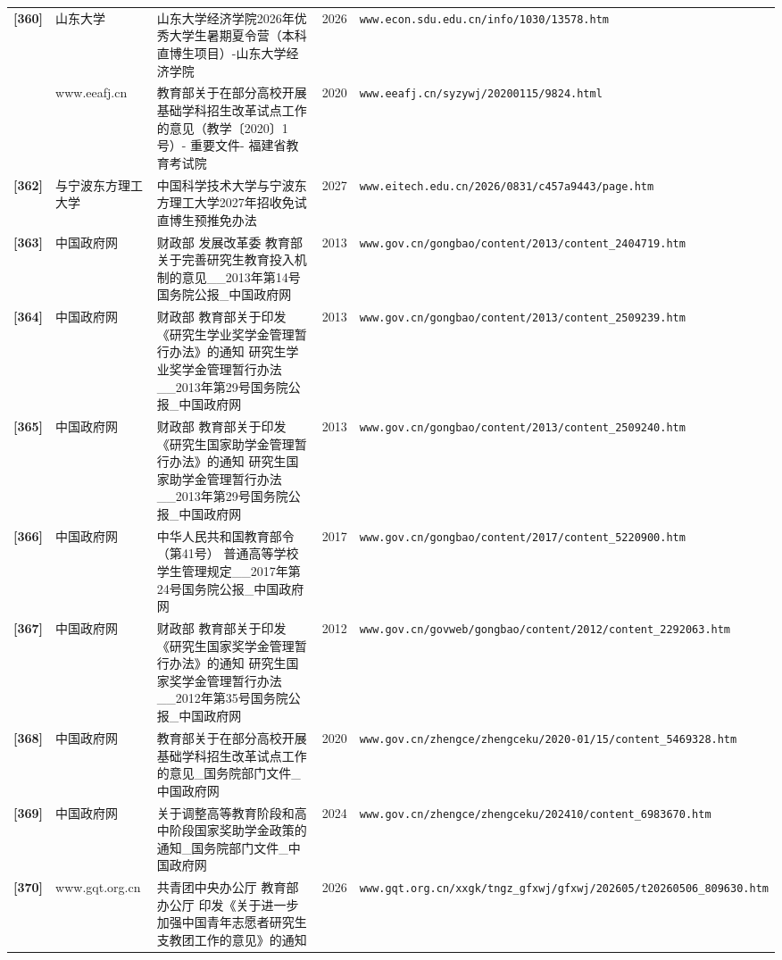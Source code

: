 {\begin{longtable}{@{}p{1.15cm}p{2.9cm}p{6.3cm}p{0.85cm}p{5.0cm}@{}}
\textbf{[360]} & 山东大学 & 山东大学经济学院2026年优秀大学生暑期夏令营（本科直博生项目）-山东大学经济学院 & 2026 & \texttt{www.econ.sdu.edu.cn/info/1030/13578.htm} \\
[361] & www.eeafj.cn & 教育部关于在部分高校开展基础学科招生改革试点工作的意见（教学〔2020〕1号）-
重要文件-
福建省教育考试院 & 2020 & \texttt{www.eeafj.cn/syzywj/20200115/9824.html} \\
\textbf{[362]} & 与宁波东方理工大学 & 中国科学技术大学与宁波东方理工大学2027年招收免试直博生预推免办法 & 2027 & \texttt{www.eitech.edu.cn/2026/0831/c457a9443/page.htm} \\
\textbf{[363]} & 中国政府网 & 财政部 发展改革委 教育部关于完善研究生教育投入机制的意见\_\_2013年第14号国务院公报\_中国政府网 & 2013 & \texttt{www.gov.cn/gongbao/content/2013/content\_2404719.htm} \\
\textbf{[364]} & 中国政府网 & 财政部 教育部关于印发《研究生学业奖学金管理暂行办法》的通知 研究生学业奖学金管理暂行办法\_\_2013年第29号国务院公报\_中国政府网 & 2013 & \texttt{www.gov.cn/gongbao/content/2013/content\_2509239.htm} \\
\textbf{[365]} & 中国政府网 & 财政部 教育部关于印发《研究生国家助学金管理暂行办法》的通知 研究生国家助学金管理暂行办法\_\_2013年第29号国务院公报\_中国政府网 & 2013 & \texttt{www.gov.cn/gongbao/content/2013/content\_2509240.htm} \\
\textbf{[366]} & 中国政府网 & 中华人民共和国教育部令（第41号） 普通高等学校学生管理规定\_\_2017年第24号国务院公报\_中国政府网 & 2017 & \texttt{www.gov.cn/gongbao/content/2017/content\_5220900.htm} \\
\textbf{[367]} & 中国政府网 & 财政部 教育部关于印发《研究生国家奖学金管理暂行办法》的通知 研究生国家奖学金管理暂行办法\_\_2012年第35号国务院公报\_中国政府网 & 2012 & \texttt{www.gov.cn/govweb/gongbao/content/2012/content\_2292063.htm} \\
\textbf{[368]} & 中国政府网 & 教育部关于在部分高校开展基础学科招生改革试点工作的意见\_国务院部门文件\_中国政府网 & 2020 & \texttt{www.gov.cn/zhengce/zhengceku/2020-01/15/content\_5469328.htm} \\
\textbf{[369]} & 中国政府网 & 关于调整高等教育阶段和高中阶段国家奖助学金政策的通知\_国务院部门文件\_中国政府网 & 2024 & \texttt{www.gov.cn/zhengce/zhengceku/202410/content\_6983670.htm} \\
\textbf{[370]} & www.gqt.org.cn & 共青团中央办公厅 教育部办公厅
印发《关于进一步加强中国青年志愿者研究生
支教团工作的意见》的通知 & 2026 & \texttt{www.gqt.org.cn/xxgk/tngz\_gfxwj/gfxwj/202605/t20260506\_809630.htm} \\

\end{longtable}}

